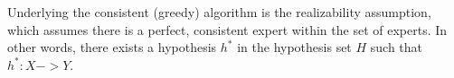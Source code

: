 \documentclass[11pt]{article}
\begin{document}
Underlying the consistent (greedy) algorithm is the realizability assumption, which assumes there is a perfect, consistent expert within the set of experts. In other words, there exists a hypothesis $h^*$ in the hypothesis set $H$ such that $h^*:X->Y$. 

 



\end{document}

